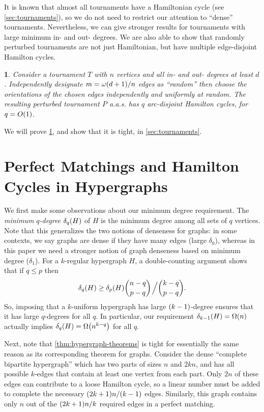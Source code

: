 \documentclass[11pt,english]{article}
\theoremstyle{plain}
\newtheorem{thm}{\protect\theoremname}
\theoremstyle{definition}
\theoremstyle{definition}
\theoremstyle{plain}
\theoremstyle{plain}
\theoremstyle{plain}
\theoremstyle{plain}
\theoremstyle{remark}
\theoremstyle{remark}
\let\originalleft\left
\let\originalright\right
\renewcommand{\left}{\mathopen{}\mathclose\bgroup\originalleft}
\renewcommand{\right}{\aftergroup\egroup\originalright}
\providecommand{\theoremname}{Theorem}
\begin{document}
It is known that almost all tournaments have a Hamiltonian cycle (see
\ref{sec:tournaments}), so we do not need to restrict our attention
to ``dense'' tournaments. Nevertheless, we can give stronger results
for tournaments with large minimum in- and out- degrees. We are also
able to show that randomly perturbed tournaments are not just Hamiltonian,
but have multiple edge-disjoint Hamilton cycles.
\begin{thm}
\label{thm:tournament}Consider a tournament $T$ with $n$ vertices
and all in- and out- degrees at least $d$. Independently designate
$m=\omega\left(d+1\right)/n$ edges as ``random'' then choose the
orientations of the chosen edges independently and uniformly at random.
The resulting perturbed tournament $P$ a.a.s. has $q$ arc-disjoint
Hamilton cycles, for $q=O\left(1\right)$.
\end{thm}
We will prove \ref{thm:tournament}, and show that it is tight, in \ref{sec:tournaments}.


\section{\label{sec:hypergraphs}Perfect Matchings and Hamilton Cycles in
Hypergraphs}

We first make some observations about our minimum degree requirement.
The \emph{minimum $q$-degree} $\delta_{q}\left(H\right)$ of $H$
is the minimum degree among all sets of $q$ vertices. Note that this
generalizes the two notions of denseness for graphs: in some contexts,
we say graphs are dense if they have many edges (large $\delta_{0}$),
whereas in this paper we need a stronger notion of graph denseness
based on minimum degree ($\delta_{1}$). For a $k$-regular hypergraph
$H$, a double-counting argument shows that if $q\le p$ then
\[
\delta_{q}\left(H\right)\ge\delta_{p}\left(H\right){n-q \choose p-q}\left.\vphantom{\sum}\right/{k-q \choose p-q}.
\]
So, imposing that a $k$-uniform hypergraph has large $\left(k-1\right)$-degree
ensures that it has large $q$-degrees for all $q$. In particular,
our requirement $\delta_{k-1}\left(H\right)=\Omega\left(n\right)$
actually implies $\delta_{q}\left(H\right)=\Omega\left(n^{k-q}\right)$
for all $q$.

Next, note that \ref{thm:hypergraph-theorems} is tight for essentially
the same reason as its corresponding theorem for graphs. Consider the dense ``complete
bipartite hypergraph'' which has two parts of sizes $n$ and
$2kn$, and has all possible $k$-edges that contain at least one
vertex from each part. Only $2n$ of these edges can contribute
to a loose Hamilton cycle, so a linear number must be added to complete
the necessary $\left(2k+1\right)n/\left(k-1\right)$ edges. Similarly, this graph contains only $n$ out of the $\left(2k+1\right)n/k$ required edges in a perfect matching.
\end{document}
